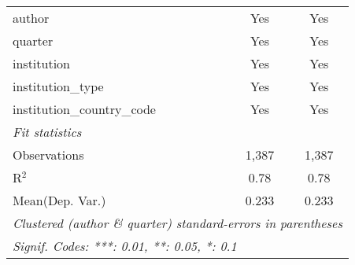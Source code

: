 \begin{tabular}{lcc}
   author                                   & Yes     & Yes\\  
   quarter                                  & Yes     & Yes\\  
   institution                              & Yes     & Yes\\  
   institution\_type                        & Yes     & Yes\\  
   institution\_country\_code               & Yes     & Yes\\  
   \midrule
   \emph{Fit statistics}\\
   Observations                             & 1,387   & 1,387\\  
   R$^2$                                    & 0.78    & 0.78\\  
Mean(Dep. Var.) & 0.233 & 0.233 \\
   \midrule \midrule
   \multicolumn{3}{l}{\emph{Clustered (author \& quarter) standard-errors in parentheses}}\\
   \multicolumn{3}{l}{\emph{Signif. Codes: ***: 0.01, **: 0.05, *: 0.1}}\\
\end{tabular}
\par\endgroup
